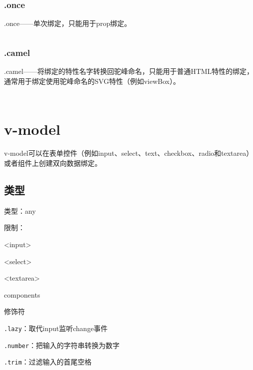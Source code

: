 \subsubsection{.once}

.once——单次绑定，只能用于prop绑定。


\begin{lstlisting}[language=JavaScript]

\end{lstlisting}


\subsubsection{.camel}

.camel——将绑定的特性名字转换回驼峰命名，只能用于普通HTML特性的绑定，通常用于绑定使用驼峰命名的SVG特性（例如viewBox）。

\begin{lstlisting}[language=JavaScript]

\end{lstlisting}




\begin{lstlisting}[language=JavaScript]

\end{lstlisting}


\section{v-model}



v-model可以在表单控件（例如input、select、text、checkbox、radio和textarea）或者组件上创建双向数据绑定。


\subsection{类型}

\begin{compactitem}
\item 类型：any
\item 限制：

\begin{compactenum}
\item <input>
\item <select>
\item <textarea>
\item components
\end{compactenum}

\item 修饰符

\begin{compactenum}
\item \texttt{.lazy}：取代input监听change事件
\item \texttt{.number}：把输入的字符串转换为数字
\item \texttt{.trim}：过滤输入的首尾空格
\end{compactenum}

\end{compactitem}

